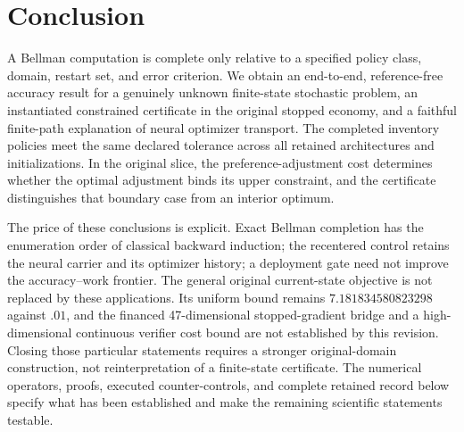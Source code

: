 \section{Conclusion}\label{sec:conclusion28}
A Bellman computation is complete only relative to a specified policy class, domain, restart set, and error criterion. We obtain an end-to-end, reference-free accuracy result for a genuinely unknown finite-state stochastic problem, an instantiated constrained certificate in the original stopped economy, and a faithful finite-path explanation of neural optimizer transport. The completed inventory policies meet the same declared tolerance across all retained architectures and initializations. In the original slice, the preference-adjustment cost determines whether the optimal adjustment binds its upper constraint, and the certificate distinguishes that boundary case from an interior optimum.

The price of these conclusions is explicit. Exact Bellman completion has the enumeration order of classical backward induction; the recentered control retains the neural carrier and its optimizer history; a deployment gate need not improve the accuracy--work frontier. The general original current-state objective is not replaced by these applications. Its uniform bound remains $7.181834580823298$ against $.01$, and the financed 47-dimensional stopped-gradient bridge and a high-dimensional continuous verifier cost bound are not established by this revision. Closing those particular statements requires a stronger original-domain construction, not reinterpretation of a finite-state certificate. The numerical operators, proofs, executed counter-controls, and complete retained record below specify what has been established and make the remaining scientific statements testable.
\begin{appendix}

\end{appendix}
\clearpage


